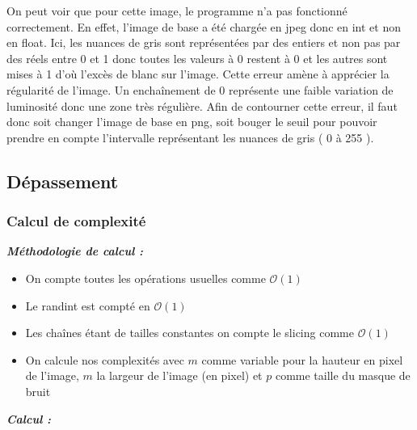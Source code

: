 \documentclass[hidelinks,11pt]{article}
\theoremstyle{mytheoremstyle}
\theoremstyle{mytheoremstyle}
\theoremstyle{myproblemstyle}
\begin{document}
    On peut voir que pour cette image, le programme n’a pas fonctionné correctement. 
    En effet, l’image de base a été chargée en jpeg donc en int et non en float. 
    Ici, les nuances de gris sont représentées par des entiers et non pas par des réels entre 0 et 1 donc toutes les valeurs à 0 restent à 0 
    et les autres sont mises à 1 d’où l’excès de blanc sur l’image.
     Cette erreur amène à apprécier la régularité de l’image. Un enchaînement de 0 représente une faible variation de luminosité donc 
     une zone très régulière. Afin de contourner cette erreur, il faut donc soit changer l’image de base en png, 
     soit bouger le seuil pour pouvoir prendre en compte l’intervalle représentant les nuances de gris ( 0 à 255 ).
    

    \subsection{Dépassement}

   \subsubsection{Calcul de complexité}

    \textit{\textbf{Méthodologie de calcul :}}
    \boldmath
    \begin{itemize}
        \item On compte toutes les opérations usuelles comme $\mathcal{O}(1)$
        \item Le randint est compté en $\mathcal{O}(1)$
        \item Les chaînes étant de tailles constantes on compte le slicing comme $\mathcal{O}(1)$
        \item On calcule nos complexités avec $m$ comme variable pour la hauteur en pixel de l'image, $m$ la largeur de l'image (en pixel) et $p$ comme taille
        du masque de bruit
    \end{itemize}
    \medskip
    \textit{\textbf{Calcul :}}
    
\end{document}
